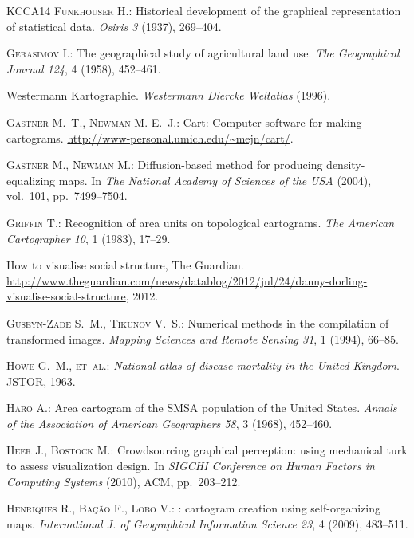 \documentclass{egpubl}
\begin{document}
\begin{thebibliography}{\uppercase{KCCA{\etalchar{*}}14}}
\textsc{Funkhouser H.}:
\newblock Historical development of the graphical representation of statistical
  data.
\newblock \emph{Osiris 3} (1937), 269--404.

\textsc{Gerasimov I.}:
\newblock The geographical study of agricultural land use.
\newblock \emph{The Geographical Journal 124}, 4 (1958), 452--461.

{Westermann Kartographie}.
\newblock \emph{Westermann Diercke Weltatlas} (1996).

\textsc{Gastner M.~T., Newman M. E.~J.}:
\newblock Cart: Computer software for making cartograms.
\newblock \url{http://www-personal.umich.edu/~mejn/cart/}.

\textsc{Gastner M., Newman M.}:
\newblock Diffusion-based method for producing density-equalizing maps.
\newblock In \emph{The National Academy of Sciences of the USA} (2004),
  vol.~101, pp.~7499--7504.

\textsc{Griffin T.}:
\newblock Recognition of area units on topological cartograms.
\newblock \emph{The American Cartographer 10}, 1 (1983), 17--29.

How to visualise social structure, {The Guardian}.
\newblock
  \url{http://www.theguardian.com/news/datablog/2012/jul/24/danny-dorling-visualise-social-structure},
  2012.

\textsc{Guseyn-Zade S.~M., Tikunov V.~S.}:
\newblock Numerical methods in the compilation of transformed images.
\newblock \emph{Mapping Sciences and Remote Sensing 31}, 1 (1994), 66--85.

\textsc{Howe G.~M., et~al.}:
\newblock \emph{National atlas of disease mortality in the United Kingdom}.
\newblock JSTOR, 1963.

\textsc{H{\"a}r{\"o} A.}:
\newblock Area cartogram of the {SMSA} population of the {United States}.
\newblock \emph{Annals of the Association of American Geographers 58}, 3
  (1968), 452--460.

\textsc{Heer J., Bostock M.}:
\newblock Crowdsourcing graphical perception: using mechanical turk to assess
  visualization design.
\newblock In \emph{SIGCHI Conference on Human Factors in Computing Systems}
  (2010), ACM, pp.~203--212.

\textsc{Henriques R., {Ba\c{c}\~{a}o} F., Lobo V.}:
: cartogram creation using self-organizing maps.
\newblock \emph{International J. of Geographical Information Science 23}, 4
  (2009), 483--511.


\end{thebibliography}
\end{document}
